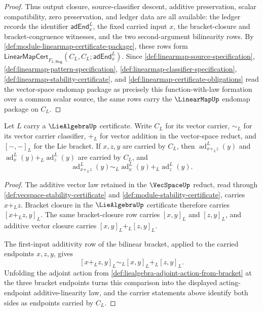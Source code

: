 \begin{proof}
Thus output closure, source-classifier descent, additive preservation, scalar compatibility, zero preservation, and ledger data are all available: the ledger records the identifier $\mathsf{adEnd}^{L}_{x}$, the fixed carried input $x$, the bracket-closure and bracket-congruence witnesses, and the two second-argument bilinearity rows. By \autoref{def:module-linearmap-certificate-package}, these rows form $\mathsf{LinearMapCert}_{F_{L,\mathsf{Ring}}}(C_L,C_L;\mathsf{adEnd}^{L}_{x})$. Since \autoref{def:linearmap-source-specification}, \autoref{def:linearmap-pattern-specification}, \autoref{def:linearmap-classifier-specification}, \autoref{def:linearmap-stability-certificate}, and \autoref{def:linearmap-certificate-obligations} read the vector-space endomap package as precisely this function-with-law formation over a common scalar source, the same rows carry the $\LinearMapUp$ endomap package on $C_L$.
\end{proof}

\begin{theorem}
\label{thm:liealgebra-adjoint-action-acting-endpoint-additive-linearity}
Let $L$ carry a $\LieAlgebraUp$ certificate. Write $C_L$ for its vector carrier, $\sim_{L}$ for its vector carrier classifier, $+_{L}$ for vector addition in the vector-space reduct, and $[-,-]_L$ for the Lie bracket. If $x,z,y$ are carried by $C_L$, then $\operatorname{ad}^{L}_{x+_{L}z}(y)$ and $\operatorname{ad}^{L}_{x}(y)+_{L}\operatorname{ad}^{L}_{z}(y)$ are carried by $C_L$, and
$$
\operatorname{ad}^{L}_{x+_{L}z}(y)
\sim_{L}
\operatorname{ad}^{L}_{x}(y)+_{L}\operatorname{ad}^{L}_{z}(y).
$$
\end{theorem}
\begin{proof}
The additive vector law retained in the $\VecSpaceUp$ reduct, read through \autoref{def:vecspace-stability-certificate} and \autoref{def:module-stability-certificate}, carries $x+_{L}z$. Bracket closure in the $\LieAlgebraUp$ certificate therefore carries $[x+_{L}z,y]_L$. The same bracket-closure row carries $[x,y]_L$ and $[z,y]_L$, and additive vector closure carries $[x,y]_L+_{L}[z,y]_L$.

The first-input additivity row of the bilinear bracket, applied to the carried endpoints $x,z,y$, gives
$$
[x+_{L}z,y]_L
\sim_{L}
[x,y]_L+_{L}[z,y]_L.
$$
Unfolding the adjoint action from \autoref{def:liealgebra-adjoint-action-from-bracket} at the three bracket endpoints turns this comparison into the displayed acting-endpoint additive-linearity law, and the carrier statements above identify both sides as endpoints carried by $C_L$.
\end{proof}


